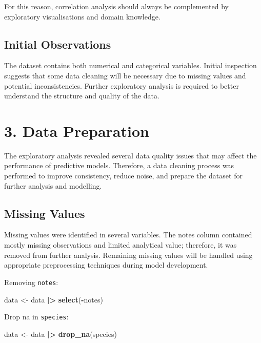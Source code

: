 \documentclass[
]{article}
\newenvironment{Shaded}{\begin{snugshade}}{\end{snugshade}}
\newcommand{\FunctionTok}[1]{\textcolor[rgb]{0.13,0.29,0.53}{\textbf{#1}}}
\newcommand{\NormalTok}[1]{#1}
\newcommand{\OtherTok}[1]{\textcolor[rgb]{0.56,0.35,0.01}{#1}}
\newcommand{\SpecialCharTok}[1]{\textcolor[rgb]{0.81,0.36,0.00}{\textbf{#1}}}
\begin{document}
For this reason, correlation analysis should always be complemented by
exploratory visualisations and domain knowledge.

\subsection{Initial Observations}\label{initial-observations}

The dataset contains both numerical and categorical variables. Initial
inspection suggests that some data cleaning will be necessary due to
missing values and potential inconsistencies. Further exploratory
analysis is required to better understand the structure and quality of
the data.

\section{3. Data Preparation}\label{data-preparation}

The exploratory analysis revealed several data quality issues that may
affect the performance of predictive models. Therefore, a data cleaning
process was performed to improve consistency, reduce noise, and prepare
the dataset for further analysis and modelling.

\subsection{Missing Values}\label{missing-values-1}

Missing values were identified in several variables. The notes column
contained mostly missing observations and limited analytical value;
therefore, it was removed from further analysis. Remaining missing
values will be handled using appropriate preprocessing techniques during
model development.

Removing \texttt{notes}:

\begin{Shaded}
\begin{Highlighting}[]
\NormalTok{data }\OtherTok{\textless{}{-}}\NormalTok{ data }\SpecialCharTok{|\textgreater{}}
  \FunctionTok{select}\NormalTok{(}\SpecialCharTok{{-}}\NormalTok{notes)}
\end{Highlighting}
\end{Shaded}

Drop na in \texttt{species}:

\begin{Shaded}
\begin{Highlighting}[]
\NormalTok{data }\OtherTok{\textless{}{-}}\NormalTok{ data }\SpecialCharTok{|\textgreater{}}
  \FunctionTok{drop\_na}\NormalTok{(species)}
\end{Highlighting}
\end{Shaded}
\end{document}
